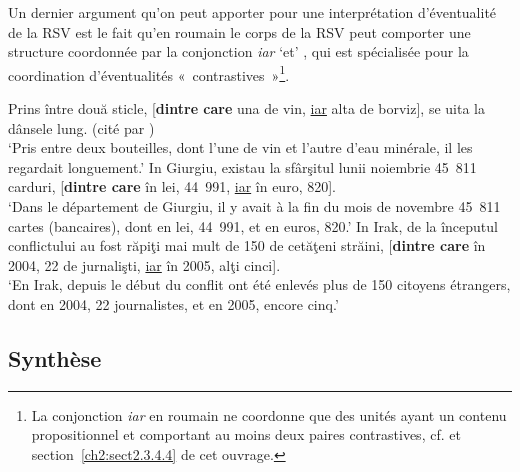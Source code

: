 Un dernier argument qu’on peut apporter pour une interprétation d’éventualité de la RSV est le fait qu’en roumain le corps de la RSV peut comporter une structure coordonnée par la conjonction \textit{iar} ‘et’ , qui est spécialisée pour la coordination d’éventualités «~contrastives~»\footnote{La conjonction \textit{iar} en roumain ne coordonne que des unités ayant un contenu propositionnel et comportant au moins deux paires contrastives, cf. \citet{BilbiieEtAl2011} et section~\ref{ch2:sect2.3.4.4} de cet ouvrage.}.

\ea \label{ch3:ex85}
\ea 
Prins între două sticle, [\textbf{dintre care} una de vin, \uline{iar} alta de borviz], se uita la dânsele lung. (cité par \citealt[268]{Gheorghe2004})  \\ 
\glt ‘Pris entre deux bouteilles, dont l’une de vin et l’autre d’eau minérale, il les regardait longuement.’
\ex 
In Giurgiu, existau la sfârşitul lunii noiembrie 45~811 carduri, [\textbf{dintre care} în lei, 44~991, \uline{iar} în euro, 820].\\
\glt ‘Dans le département de Giurgiu, il y avait à la fin du mois de novembre 45~811 cartes (bancaires), dont en lei, 44~991, et en euros, 820.’  
\ex 
In Irak, de la începutul conflictului au fost răpiţi mai mult de 150 de cetăţeni străini, [\textbf{dintre care} în 2004, 22 de jurnalişti, \uline{iar} în 2005, alţi cinci]. \\
\glt ‘En Irak, depuis le début du conflit ont été enlevés plus de 150 citoyens étrangers, dont en 2004, 22 journalistes, et en 2005, encore cinq.’
\z 
\z 


\subsection{Synthèse}\label{ch3:sect3.3.4}

